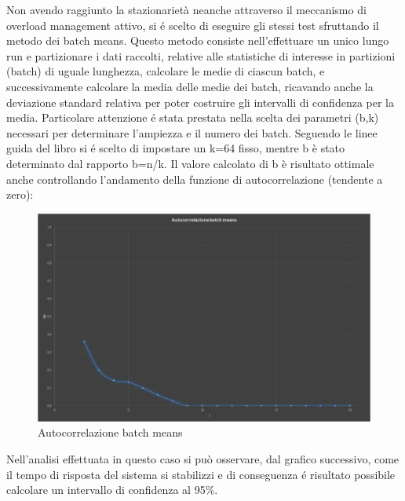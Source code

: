 Non avendo raggiunto la stazionariet\`a neanche attraverso il meccanismo di overload
management attivo, si \'e scelto di eseguire gli stessi test sfruttando il metodo dei batch
means. Questo metodo consiste nell'effettuare un unico lungo run e partizionare i dati raccolti, relative 
alle statistiche di interesse in partizioni (batch) di uguale lunghezza, calcolare le medie di 
ciascun batch, e successivamente calcolare la media delle medie dei batch, ricavando 
anche la deviazione standard relativa per poter costruire gli intervalli di confidenza per la 
media. Particolare attenzione \'e stata prestata nella scelta dei parametri (b,k) necessari per 
determinare l'ampiezza e il numero dei batch. Seguendo le linee guida del libro si \'e scelto 
di impostare un k=64 fisso, mentre b è stato determinato dal rapporto b=n/k.
Il valore calcolato di b è risultato ottimale anche controllando l'andamento della funzione di 
autocorrelazione (tendente a zero):

\begin{figure}[H]
 \centering
 \includegraphics[scale=0.45]{img/autocorrBM.png}
 \caption[Autocorrelazione batch means]{Autocorrelazione batch means}
 \label{fig:Autocorrelazione batch means}
\end{figure}

Nell'analisi effettuata in questo caso si pu\`o osservare, dal grafico successivo, come il tempo
di risposta del sistema si stabilizzi e di conseguenza \'e risultato possibile calcolare un intervallo
di confidenza al 95\%. 

